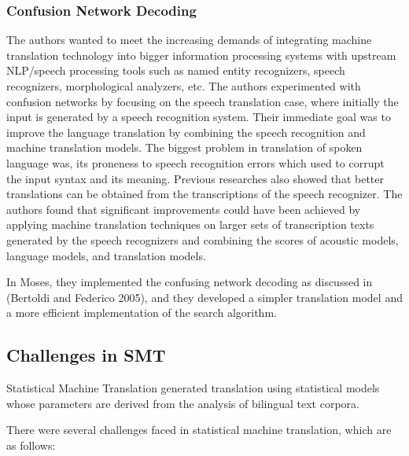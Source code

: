 \subsubsection{Confusion Network Decoding}
The authors wanted to meet the increasing demands of integrating machine translation technology into bigger information processing systems with upstream NLP/speech processing tools such as named entity recognizers, speech recognizers, morphological analyzers, etc. The authors experimented with confusion networks by focusing on the speech translation case, where initially the input is generated by a speech recognition system. Their immediate goal was to improve the language translation by combining the speech recognition and machine translation models. The biggest problem in translation of spoken language was, its proneness to speech recognition errors which used to corrupt the input syntax and its meaning. Previous researches also showed that better translations can be obtained from the transcriptions of the speech recognizer.  The authors found that significant improvements could have been achieved by applying machine translation techniques on larger sets of transcription texts generated by the speech recognizers and combining the scores of acoustic models, language models, and translation models. 

In Moses, they implemented the confusing network decoding as discussed in (Bertoldi and Federico 2005), and they developed a simpler translation model and a more efficient implementation of the search algorithm.

\subsection{Challenges in SMT}

Statistical Machine Translation generated translation using statistical models whose parameters are derived from the analysis of bilingual text corpora. 

There were several challenges faced in statistical machine translation, which are as follows:

